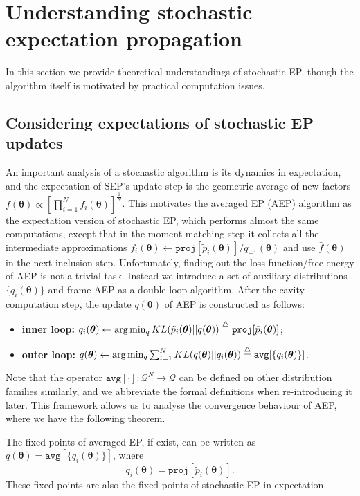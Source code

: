 \section{Understanding stochastic expectation propagation}
In this section we provide theoretical understandings of stochastic EP, though the algorithm itself is motivated by practical computation issues. 

\subsection{Considering expectations of stochastic EP updates}
An important analysis of a stochastic algorithm is its dynamics in expectation, and the expectation of SEP's update step is the geometric average of new factors
$\bar{f}(\bm{\theta}) \propto [\prod_{i=1}^N f_i(\bm{\theta})]^{\frac{1}{N}}$.
This motivates the averaged EP (AEP) algorithm as the expectation version of stochastic EP, which performs almost the same computations, except that in the moment matching step it collects all the intermediate approximations $f_i(\bm{\theta}) \leftarrow \mathtt{proj}[\tilde{p}_i(\bm{\theta})] / q_{-1}(\bm{\theta})$ and use $\bar{f}(\bm{\theta})$ in the next inclusion step. 
Unfortunately, finding out the loss function/free energy of AEP is not a trivial task. Instead we introduce a set of auxiliary distributions $\{q_i(\bm{\theta})\}$ and frame AEP as a double-loop algorithm. After the cavity computation step, the update $q(\bm{\theta})$ of AEP is constructed as follows:
%
\begin{itemize}
	\item \textbf{inner loop:} $q_i(\bm{\theta}) \leftarrow \arg\min_q KL(\tilde{p}_i(\bm{\theta}) ||q(\bm{\theta})) \buildrel\triangle\over = \mathtt{proj}[\tilde{p}_i(\bm{\theta})]$; 
	\item \textbf{outer loop:} $q(\bm{\theta}) \leftarrow \arg\min_q \sum_{i=1}^N KL(q(\bm{\theta}) ||q_i(\bm{\theta})) \buildrel\triangle\over = \mathtt{avg}[\{q_i(\bm{\theta})\}]$.
\end{itemize}
%
Note that the operator $\mathtt{avg}[\cdot]: \mathcal{Q}^N \rightarrow \mathcal{Q}$ can be defined on other distribution families similarly, and we abbreviate the formal definitions when re-introducing it later.
This framework allows us to analyse the convergence behaviour of AEP, where we have the following theorem.
\begin{theorem}
The fixed points of averaged EP, if exist, can be written as $q(\bm{\theta}) = \mathtt{avg}[\{q_i(\bm{\theta})\}]$, where
\begin{equation}
q_i(\bm{\theta}) = \mathtt{proj}[\tilde{p}_i(\bm{\theta})].
\label{eq:mm}
\end{equation}
These fixed points are also the fixed points of stochastic EP in expectation. 
\end{theorem}
